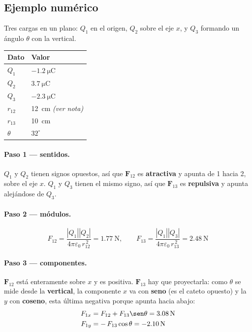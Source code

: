 \documentclass[12pt,a4paper]{article}
\begin{document}
\subsection{Ejemplo numérico}

Tres cargas en un plano: $Q_1$ en el origen, $Q_2$ sobre el eje $x$, y $Q_3$
formando un ángulo $\theta$ con la vertical.

\begin{table}[H]
\centering
\begin{tabular}{ll}
\toprule
\textbf{Dato} & \textbf{Valor} \\
\midrule
$Q_1$    & $\SI{-1.2}{\micro\coulomb}$ \\
$Q_2$    & $\SI{+3.7}{\micro\coulomb}$ \\
$Q_3$    & $\SI{-2.3}{\micro\coulomb}$ \\
$r_{12}$ & \SI{12}{\centi\metre} \emph{(ver nota)} \\
$r_{13}$ & \SI{10}{\centi\metre} \\
$\theta$ & $32^\circ$ \\
\bottomrule
\end{tabular}
\end{table}



\paragraph{Paso 1 --- sentidos.}
$Q_1$ y $Q_2$ tienen signos opuestos, así que $\mathbf{F}_{12}$ es
\textbf{atractiva} y apunta de 1 hacia 2, sobre el eje $x$. $Q_1$ y $Q_3$ tienen
el mismo signo, así que $\mathbf{F}_{13}$ es \textbf{repulsiva} y apunta
alejándose de $Q_3$.

\paragraph{Paso 2 --- módulos.}
\[
F_{12} = \frac{|Q_1||Q_2|}{4\pi\varepsilon_0\, r_{12}^{\,2}} = \SI{1.77}{\newton},
\qquad
F_{13} = \frac{|Q_1||Q_3|}{4\pi\varepsilon_0\, r_{13}^{\,2}} = \SI{2.48}{\newton}
\]

\paragraph{Paso 3 --- componentes.}
$\mathbf{F}_{12}$ está enteramente sobre $x$ y es positiva. $\mathbf{F}_{13}$ hay
que proyectarla: como $\theta$ se mide desde la \textbf{vertical}, la componente
$x$ va con \textbf{seno} (es el cateto opuesto) y la $y$ con \textbf{coseno}, esta
última negativa porque apunta hacia abajo:
\begin{align*}
F_{1x} &= F_{12} + F_{13}\sen\theta = \SI{3.08}{\newton} \\
F_{1y} &= -\,F_{13}\cos\theta = \SI{-2.10}{\newton}
\end{align*}
\end{document}
